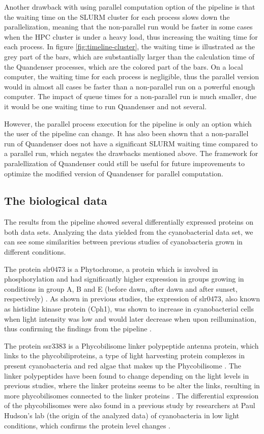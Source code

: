 Another drawback with using parallel computation option of the pipeline is that the waiting time on the SLURM cluster for each process slows down the parallelization, meaning that the non-parallel run would be faster in some cases when the HPC cluster is under a heavy load, thus increasing the waiting time for each process. In figure \ref{fig:timeline-cluster}, the waiting time is illustrated as the grey part of the bars, which are substantially larger than the calculation time of the Quandenser processes, which are the colored part of the bars. On a local computer, the waiting time for each process is negligible, thus the parallel version would in almost all cases be faster than a non-parallel run on a powerful enough computer. The impact of queue times for a non-parallel run is much smaller, due it would be one waiting time to run Quandenser and not several.

However, the parallel process execution for the pipeline is only an option which the user of the pipeline can change. It has also been shown that a non-parallel run of Quandenser does not have a significant SLURM waiting time compared to a parallel run, which negates the drawbacks mentioned above. The framework for paralellization of Quandenser could still be useful for future improvements to optimize the modified version of Quandenser for parallel computation.

\subsection{The biological data}
The results from the pipeline showed several differentially expressed proteins on both data sets. Analyzing the data yielded from the cyanobacterial data set, we can see some similarities between previous studies of cyanobacteria grown in different conditions.


The protein slr0473 is a Phytochrome, a protein which is involved in phosphorylation and had significantly higher expression in groups growing in conditions in group A, B and E (before dawn, after dawn and after sunset, respectively) \cite{phytochrome}. As shown in previous studies, the expression of slr0473, also known as histidine kinase protein (Cph1), was shown to increase in cyanobacterial cells when light intensity was low and would later decrease when upon reillumination, thus confirming the findings from the pipeline \cite{phytochrome-dark}.

The protein ssr3383 is a Phycobilisome linker polypeptide antenna protein, which links to the phycobiliproteins, a type of light harvesting protein complexes in present cyanobacteria and red algae that makes up the Phycobilisome \cite{phycobilisomes}. The linker polypeptides have been found to change depending on the light levels in previous studies, where the linker proteins seems to be alter the links, resulting in more phycobilisomes connected to the linker proteins \cite{cyano-low-light}. The differential expression of the phycobilisomes were also found in a previous study by researchers at Paul Hudson's lab (the origin of the analyzed data) of cyanobacteria in low light conditions, which confirms the protein level changes \cite{michael-jahn-cyano}.

